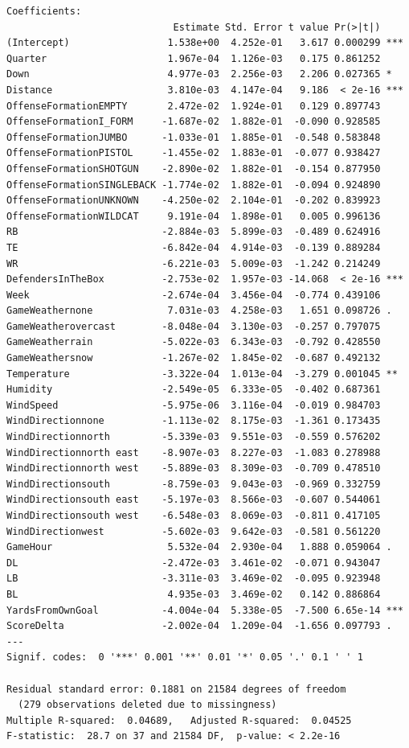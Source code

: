 \documentclass[
  super,
  preprint,
  3p]{elsarticle}
\begin{document}
\begin{verbatim}
Coefficients:
                             Estimate Std. Error t value Pr(>|t|)    
(Intercept)                 1.538e+00  4.252e-01   3.617 0.000299 ***
Quarter                     1.967e-04  1.126e-03   0.175 0.861252    
Down                        4.977e-03  2.256e-03   2.206 0.027365 *  
Distance                    3.810e-03  4.147e-04   9.186  < 2e-16 ***
OffenseFormationEMPTY       2.472e-02  1.924e-01   0.129 0.897743    
OffenseFormationI_FORM     -1.687e-02  1.882e-01  -0.090 0.928585    
OffenseFormationJUMBO      -1.033e-01  1.885e-01  -0.548 0.583848    
OffenseFormationPISTOL     -1.455e-02  1.883e-01  -0.077 0.938427    
OffenseFormationSHOTGUN    -2.890e-02  1.882e-01  -0.154 0.877950    
OffenseFormationSINGLEBACK -1.774e-02  1.882e-01  -0.094 0.924890    
OffenseFormationUNKNOWN    -4.250e-02  2.104e-01  -0.202 0.839923    
OffenseFormationWILDCAT     9.191e-04  1.898e-01   0.005 0.996136    
RB                         -2.884e-03  5.899e-03  -0.489 0.624916    
TE                         -6.842e-04  4.914e-03  -0.139 0.889284    
WR                         -6.221e-03  5.009e-03  -1.242 0.214249    
DefendersInTheBox          -2.753e-02  1.957e-03 -14.068  < 2e-16 ***
Week                       -2.674e-04  3.456e-04  -0.774 0.439106    
GameWeathernone             7.031e-03  4.258e-03   1.651 0.098726 .  
GameWeatherovercast        -8.048e-04  3.130e-03  -0.257 0.797075    
GameWeatherrain            -5.022e-03  6.343e-03  -0.792 0.428550    
GameWeathersnow            -1.267e-02  1.845e-02  -0.687 0.492132    
Temperature                -3.322e-04  1.013e-04  -3.279 0.001045 ** 
Humidity                   -2.549e-05  6.333e-05  -0.402 0.687361    
WindSpeed                  -5.975e-06  3.116e-04  -0.019 0.984703    
WindDirectionnone          -1.113e-02  8.175e-03  -1.361 0.173435    
WindDirectionnorth         -5.339e-03  9.551e-03  -0.559 0.576202    
WindDirectionnorth east    -8.907e-03  8.227e-03  -1.083 0.278988    
WindDirectionnorth west    -5.889e-03  8.309e-03  -0.709 0.478510    
WindDirectionsouth         -8.759e-03  9.043e-03  -0.969 0.332759    
WindDirectionsouth east    -5.197e-03  8.566e-03  -0.607 0.544061    
WindDirectionsouth west    -6.548e-03  8.069e-03  -0.811 0.417105    
WindDirectionwest          -5.602e-03  9.642e-03  -0.581 0.561220    
GameHour                    5.532e-04  2.930e-04   1.888 0.059064 .  
DL                         -2.472e-03  3.461e-02  -0.071 0.943047    
LB                         -3.311e-03  3.469e-02  -0.095 0.923948    
BL                          4.935e-03  3.469e-02   0.142 0.886864    
YardsFromOwnGoal           -4.004e-04  5.338e-05  -7.500 6.65e-14 ***
ScoreDelta                 -2.002e-04  1.209e-04  -1.656 0.097793 .  
---
Signif. codes:  0 '***' 0.001 '**' 0.01 '*' 0.05 '.' 0.1 ' ' 1

Residual standard error: 0.1881 on 21584 degrees of freedom
  (279 observations deleted due to missingness)
Multiple R-squared:  0.04689,   Adjusted R-squared:  0.04525 
F-statistic:  28.7 on 37 and 21584 DF,  p-value: < 2.2e-16
\end{verbatim}
\end{document}
